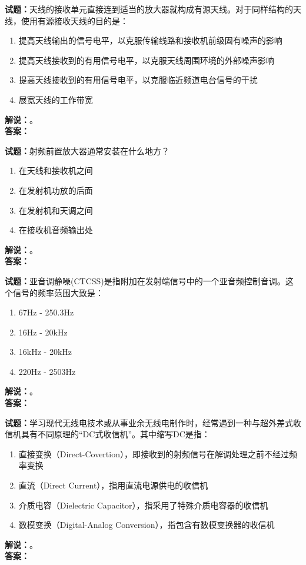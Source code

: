 \documentclass{ctexbook}
\begin{document}
\bigskip

\noindent\textbf{试题：}天线的接收单元直接连到适当的放大器就构成有源天线。对于同样结构的天线，使用有源接收天线的目的是：
\begin{enumerate}[leftmargin=3em]
  \item 提高天线输出的信号电平，以克服传输线路和接收机前级固有噪声的影响
  \item 提高天线接收到的有用信号电平，以克服天线周围环境的外部噪声影响
  \item 提高天线接收到的有用信号电平，以克服临近频道电台信号的干扰
  \item 展宽天线的工作带宽
\end{enumerate}
\noindent\textbf{解说：}\textbf{}。\\\noindent\textbf{答案：}

\bigskip

\noindent\textbf{试题：}射频前置放大器通常安装在什么地方？
\begin{enumerate}[leftmargin=3em]
  \item 在天线和接收机之间
  \item 在发射机功放的后面
  \item 在发射机和天调之间
  \item 在接收机音频输出处
\end{enumerate}
\noindent\textbf{解说：}\textbf{}。\\\noindent\textbf{答案：}

\bigskip

\noindent\textbf{试题：}亚音调静噪(CTCSS)是指附加在发射端信号中的一个亚音频控制音调。这个信号的频率范围大致是：
\begin{enumerate}[leftmargin=3em]
  \item 67Hz - 250.3Hz
  \item 16Hz - 20\unit{\kHz}
  \item 16\unit{\kHz} - 20\unit{\kHz}
  \item 220Hz - 2503Hz
\end{enumerate}
\noindent\textbf{解说：}\textbf{}。\\\noindent\textbf{答案：}

\bigskip

\noindent\textbf{试题：}学习现代无线电技术或从事业余无线电制作时，经常遇到一种与超外差式收信机具有不同原理的“DC式收信机”。其中缩写DC是指：
\begin{enumerate}[leftmargin=3em]
  \item 直接变换（Direct-Covertion），即接收到的射频信号在解调处理之前不经过频率变换
  \item 直流（Direct Current），指用直流电源供电的收信机
  \item 介质电容（Dielectric Capacitor），指采用了特殊介质电容器的收信机
  \item 数模变换（Digital-Analog Conversion），指包含有数模变换器的收信机
\end{enumerate}
\noindent\textbf{解说：}\textbf{}。\\\noindent\textbf{答案：}
\end{document}
